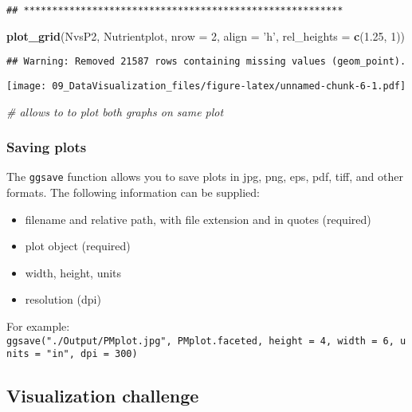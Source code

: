 \documentclass[]{article}
\newenvironment{Shaded}{\begin{snugshade}}{\end{snugshade}}
\newcommand{\KeywordTok}[1]{\textcolor[rgb]{0.13,0.29,0.53}{\textbf{#1}}}
\newcommand{\DataTypeTok}[1]{\textcolor[rgb]{0.13,0.29,0.53}{#1}}
\newcommand{\DecValTok}[1]{\textcolor[rgb]{0.00,0.00,0.81}{#1}}
\newcommand{\FloatTok}[1]{\textcolor[rgb]{0.00,0.00,0.81}{#1}}
\newcommand{\StringTok}[1]{\textcolor[rgb]{0.31,0.60,0.02}{#1}}
\newcommand{\CommentTok}[1]{\textcolor[rgb]{0.56,0.35,0.01}{\textit{#1}}}
\newcommand{\NormalTok}[1]{#1}
\providecommand{\tightlist}{%
  \setlength{\itemsep}{0pt}\setlength{\parskip}{0pt}}
\begin{document}
\begin{verbatim}
## ********************************************************
\end{verbatim}

\begin{Shaded}
\begin{Highlighting}[]
\KeywordTok{plot_grid}\NormalTok{(NvsP2, Nutrientplot, }\DataTypeTok{nrow =} \DecValTok{2}\NormalTok{, }\DataTypeTok{align =} \StringTok{'h'}\NormalTok{, }\DataTypeTok{rel_heights =} \KeywordTok{c}\NormalTok{(}\FloatTok{1.25}\NormalTok{, }\DecValTok{1}\NormalTok{))}
\end{Highlighting}
\end{Shaded}

\begin{verbatim}
## Warning: Removed 21587 rows containing missing values (geom_point).
\end{verbatim}

\texttt{[image: 09\_DataVisualization\_files/figure-latex/unnamed-chunk-6-1.pdf]}

\begin{Shaded}
\begin{Highlighting}[]
\CommentTok{# allows to to plot both graphs on same plot}
\end{Highlighting}
\end{Shaded}

\subsubsection{Saving plots}\label{saving-plots}

The \texttt{ggsave} function allows you to save plots in jpg, png, eps,
pdf, tiff, and other formats. The following information can be supplied:

\begin{itemize}
\tightlist
\item
  filename and relative path, with file extension and in quotes
  (required)
\item
  plot object (required)
\item
  width, height, units
\item
  resolution (dpi)
\end{itemize}

For example:
\texttt{ggsave("./Output/PMplot.jpg",\ PMplot.faceted,\ height\ =\ 4,\ width\ =\ 6,\ units\ =\ "in",\ dpi\ =\ 300)}

\subsection{Visualization challenge}\label{visualization-challenge}
\end{document}
